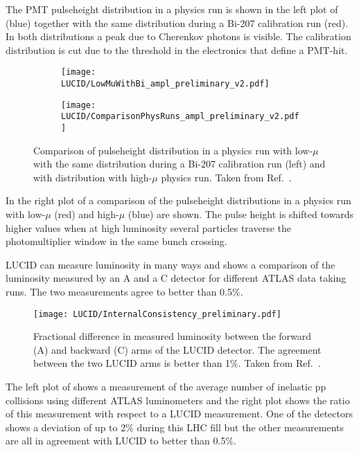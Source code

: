 The PMT pulseheight distribution in a physics run is shown in the left plot of  (blue) 
together with the same distribution 
during a Bi-207 calibration run (red). In both distributions a peak due to Cherenkov photons is visible. The 
calibration distribution is cut due to the threshold in the electronics that define a PMT-hit.

\begin{figure}
\centering
\begin{subfigure}{.5\textwidth}
  \centering
  \texttt{[image: LUCID/LowMuWithBi\_ampl\_preliminary\_v2.pdf]}
  \label{fig:sub1}
\end{subfigure}%
\begin{subfigure}{.5\textwidth}
  \centering
  \texttt{[image: LUCID/ComparisonPhysRuns\_ampl\_preliminary\_v2.pdf]}
  \label{fig:sub2}
\end{subfigure}
\caption{Comparison of pulseheight distribution in a physics run with low-$\mu$ with the same distribution 
during a Bi-207 calibration run (left) and with distribution with high-$\mu$ physics run. Taken from Ref.~\cite{publicPlots}.}
\label{fig:Pulseheight}
\end{figure}


In the right plot of  a comparison of the pulseheight distributions in a physics run 
with
low-$\mu$ (red) and high-$\mu$ (blue) are shown. The pulse height is shifted towards higher values when at high 
luminosity several particles traverse the photomultiplier window in the same bunch crossing.


LUCID can measure luminosity in many ways and  shows a comparison of the 
luminosity measured by an A and 
a C detector for different ATLAS data taking runs. The two measurements agree to better than 0.5$\%$.

\begin{figure}
\centering
\texttt{[image: LUCID/InternalConsistency\_preliminary.pdf]}
\caption{Fractional difference in measured luminosity between the forward (A) and backward (C) arms of the LUCID 
detector. The agreement between the two LUCID arms is better than 1$\%$. Taken from Ref.~\cite{publicPlots}.}
\label{fig:InternalConsistency}
\end{figure}

The left plot of  shows a measurement of the average number of inelastic pp collisions 
using different ATLAS 
luminometers and the right plot shows the ratio of this measurement with respect to a LUCID measurement. One of the 
detectors shows a deviation of up to 2$\%$ during this LHC fill but the other measurements are all in agreement 
with LUCID to better than 0.5$\%$.

